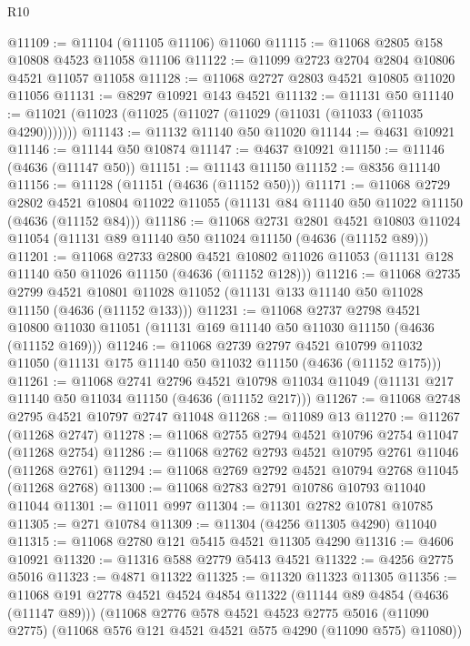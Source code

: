 \begin{lexlean}{R10}
\begin{coremodule}
@11109 := @11104 (@11105 @11106) @11060
@11115 := @11068 @2805 @158 @10808 @4523 @11058 @11106
@11122 := @11099 @2723 @2704 @2804 @10806 @4521 @11057 @11058
@11128 := @11068 @2727 @2803 @4521 @10805 @11020 @11056
@11131 := @8297 @10921 @143 @4521
@11132 := @11131 @50
@11140 := @11021 (@11023 (@11025 (@11027 (@11029 (@11031 (@11033 (@11035 @4290)))))))
@11143 := @11132 @11140 @50 @11020
@11144 := @4631 @10921
@11146 := @11144 @50 @10874
@11147 := @4637 @10921
@11150 := @11146 (@4636 (@11147 @50))
@11151 := @11143 @11150
@11152 := @8356 @11140
@11156 := @11128 (@11151 (@4636 (@11152 @50)))
@11171 := @11068
    @2729
    @2802
    @4521
    @10804
    @11022
    @11055
    (@11131 @84 @11140 @50 @11022 @11150 (@4636 (@11152 @84)))
@11186 := @11068
    @2731
    @2801
    @4521
    @10803
    @11024
    @11054
    (@11131 @89 @11140 @50 @11024 @11150 (@4636 (@11152 @89)))
@11201 := @11068
    @2733
    @2800
    @4521
    @10802
    @11026
    @11053
    (@11131 @128 @11140 @50 @11026 @11150 (@4636 (@11152 @128)))
@11216 := @11068
    @2735
    @2799
    @4521
    @10801
    @11028
    @11052
    (@11131 @133 @11140 @50 @11028 @11150 (@4636 (@11152 @133)))
@11231 := @11068
    @2737
    @2798
    @4521
    @10800
    @11030
    @11051
    (@11131 @169 @11140 @50 @11030 @11150 (@4636 (@11152 @169)))
@11246 := @11068
    @2739
    @2797
    @4521
    @10799
    @11032
    @11050
    (@11131 @175 @11140 @50 @11032 @11150 (@4636 (@11152 @175)))
@11261 := @11068
    @2741
    @2796
    @4521
    @10798
    @11034
    @11049
    (@11131 @217 @11140 @50 @11034 @11150 (@4636 (@11152 @217)))
@11267 := @11068 @2748 @2795 @4521 @10797 @2747 @11048
@11268 := @11089 @13
@11270 := @11267 (@11268 @2747)
@11278 := @11068 @2755 @2794 @4521 @10796 @2754 @11047 (@11268 @2754)
@11286 := @11068 @2762 @2793 @4521 @10795 @2761 @11046 (@11268 @2761)
@11294 := @11068 @2769 @2792 @4521 @10794 @2768 @11045 (@11268 @2768)
@11300 := @11068 @2783 @2791 @10786 @10793 @11040 @11044
@11301 := @11011 @997
@11304 := @11301 @2782 @10781 @10785
@11305 := @271 @10784
@11309 := @11304 (@4256 @11305 @4290) @11040
@11315 := @11068 @2780 @121 @5415 @4521 @11305 @4290
@11316 := @4606 @10921
@11320 := @11316 @588 @2779 @5413 @4521
@11322 := @4256 @2775 @5016
@11323 := @4871 @11322
@11325 := @11320 @11323 @11305
@11356 := @11068
    @191
    @2778
    @4521
    @4524
    @4854
    @11322
    (@11144 @89 @4854 (@4636 (@11147 @89)))
    (@11068
      @2776
      @578
      @4521
      @4523
      @2775
      @5016
      (@11090 @2775)
      (@11068 @576 @121 @4521 @4521 @575 @4290 (@11090 @575) @11080))

\end{coremodule}
\end{lexlean}
